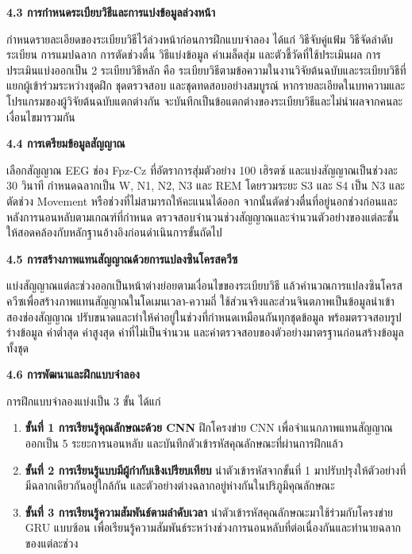\documentclass[12pt,a4paper]{article}
\newcommand{\subsectionthai}[1]{%
  \par\vspace{0.35\baselineskip}%
  \noindent\textbf{#1}\par\nobreak\vspace{0.1\baselineskip}%
}
\begin{document}
\subsectionthai{4.3 การกำหนดระเบียบวิธีและการแบ่งข้อมูลล่วงหน้า}

กำหนดรายละเอียดของระเบียบวิธีไว้ล่วงหน้าก่อนการฝึกแบบจำลอง ได้แก่ วิธีจับคู่แฟ้ม วิธีจัดลำดับระเบียน การแมปฉลาก การตัดช่วงตื่น วิธีแบ่งข้อมูล ค่าเมล็ดสุ่ม และตัวชี้วัดที่ใช้ประเมินผล การประเมินแบ่งออกเป็น 2 ระเบียบวิธีหลัก คือ ระเบียบวิธีตามข้อความในงานวิจัยต้นฉบับและระเบียบวิธีที่แยกผู้เข้าร่วมระหว่างชุดฝึก ชุดตรวจสอบ และชุดทดสอบอย่างสมบูรณ์ หากรายละเอียดในบทความและโปรแกรมของผู้วิจัยต้นฉบับแตกต่างกัน จะบันทึกเป็นข้อแตกต่างของระเบียบวิธีและไม่นำผลจากคนละเงื่อนไขมารวมกัน

\subsectionthai{4.4 การเตรียมข้อมูลสัญญาณ}

เลือกสัญญาณ EEG ช่อง Fpz-Cz ที่อัตราการสุ่มตัวอย่าง 100 เฮิรตซ์ และแบ่งสัญญาณเป็นช่วงละ 30 วินาที กำหนดฉลากเป็น W, N1, N2, N3 และ REM โดยรวมระยะ S3 และ S4 เป็น N3 และตัดช่วง Movement หรือช่วงที่ไม่สามารถให้คะแนนได้ออก จากนั้นตัดช่วงตื่นที่อยู่นอกช่วงก่อนและหลังการนอนหลับตามเกณฑ์ที่กำหนด ตรวจสอบจำนวนช่วงสัญญาณและจำนวนตัวอย่างของแต่ละชั้นให้สอดคล้องกับหลักฐานอ้างอิงก่อนดำเนินการขั้นถัดไป

\subsectionthai{4.5 การสร้างภาพแทนสัญญาณด้วยการแปลงซินโครสควีซ}

แบ่งสัญญาณแต่ละช่วงออกเป็นหน้าต่างย่อยตามเงื่อนไขของระเบียบวิธี แล้วคำนวณการแปลงซินโครสควีซเพื่อสร้างภาพแทนสัญญาณในโดเมนเวลา-ความถี่ ใช้ส่วนจริงและส่วนจินตภาพเป็นข้อมูลนำเข้าสองช่องสัญญาณ ปรับขนาดและทำให้ค่าอยู่ในช่วงที่กำหนดเหมือนกันทุกชุดข้อมูล พร้อมตรวจสอบรูปร่างข้อมูล ค่าต่ำสุด ค่าสูงสุด ค่าที่ไม่เป็นจำนวน และค่าตรวจสอบของตัวอย่างมาตรฐานก่อนสร้างข้อมูลทั้งชุด

\subsectionthai{4.6 การพัฒนาและฝึกแบบจำลอง}

การฝึกแบบจำลองแบ่งเป็น 3 ขั้น ได้แก่

\begin{enumerate}[label=\arabic*.]
  \item \textbf{ขั้นที่ 1 การเรียนรู้คุณลักษณะด้วย CNN} ฝึกโครงข่าย CNN เพื่อจำแนกภาพแทนสัญญาณออกเป็น 5 ระยะการนอนหลับ และบันทึกตัวเข้ารหัสคุณลักษณะที่ผ่านการฝึกแล้ว
  \item \textbf{ขั้นที่ 2 การเรียนรู้แบบมีผู้กำกับเชิงเปรียบเทียบ} นำตัวเข้ารหัสจากขั้นที่ 1 มาปรับปรุงให้ตัวอย่างที่มีฉลากเดียวกันอยู่ใกล้กัน และตัวอย่างต่างฉลากอยู่ห่างกันในปริภูมิคุณลักษณะ
  \item \textbf{ขั้นที่ 3 การเรียนรู้ความสัมพันธ์ตามลำดับเวลา} นำตัวเข้ารหัสคุณลักษณะมาใช้ร่วมกับโครงข่าย GRU แบบซ้อน เพื่อเรียนรู้ความสัมพันธ์ระหว่างช่วงการนอนหลับที่ต่อเนื่องกันและทำนายฉลากของแต่ละช่วง
\end{enumerate}
\end{document}
